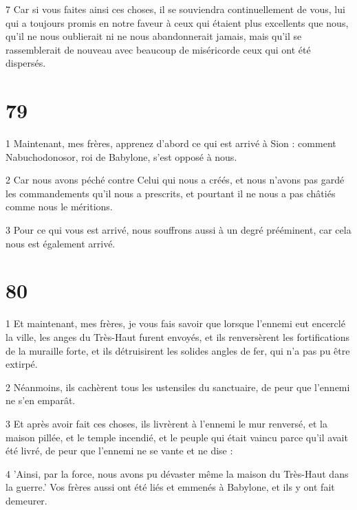 \par 7 Car si vous faites ainsi ces choses, il se souviendra continuellement de vous, lui qui a toujours promis en notre faveur à ceux qui étaient plus excellents que nous, qu'il ne nous oublierait ni ne nous abandonnerait jamais, mais qu'il se rassemblerait de nouveau avec beaucoup de miséricorde ceux qui ont été dispersés.

\chapter{79}

\par 1 Maintenant, mes frères, apprenez d'abord ce qui est arrivé à Sion : comment Nabuchodonosor, roi de Babylone, s'est opposé à nous.

\par 2 Car nous avons péché contre Celui qui nous a créés, et nous n'avons pas gardé les commandements qu'il nous a prescrits, et pourtant il ne nous a pas châtiés comme nous le méritions.

\par 3 Pour ce qui vous est arrivé, nous souffrons aussi à un degré prééminent, car cela nous est également arrivé.

\chapter{80}

\par 1 Et maintenant, mes frères, je vous fais savoir que lorsque l'ennemi eut encerclé la ville, les anges du Très-Haut furent envoyés, et ils renversèrent les fortifications de la muraille forte, et ils détruisirent les solides angles de fer, qui n'a pas pu être extirpé.

\par 2 Néanmoins, ils cachèrent tous les ustensiles du sanctuaire, de peur que l'ennemi ne s'en emparât.

\par 3 Et après avoir fait ces choses, ils livrèrent à l'ennemi le mur renversé, et la maison pillée, et le temple incendié, et le peuple qui était vaincu parce qu'il avait été livré, de peur que l'ennemi ne se vante et ne dise :

\par 4 'Ainsi, par la force, nous avons pu dévaster même la maison du Très-Haut dans la guerre.' Vos frères aussi ont été liés et emmenés à Babylone, et ils y ont fait demeurer.

